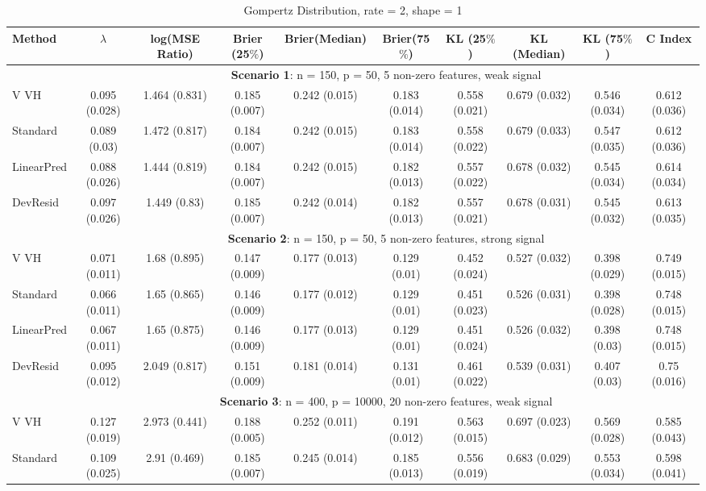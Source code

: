 \documentclass{article}
\begin{document}
\begin{landscape}
\begin{table}[ht]
\caption{\label{Tab:sim} Gompertz Distribution, rate = 2, shape = 1}
\centering
\begin{tabular}[t]{lccccccccc}
\toprule
 Method & $\lambda$ & log(MSE Ratio) & Brier (25$\%$) & Brier(Median) & Brier(75$\%$) & KL (25$\%$)& KL (Median) & KL (75$\%$) & C Index\\
\midrule
&\multicolumn{9}{c}{\textbf{Scenario 1}: n = 150, p = 50, 5 non-zero features, weak signal}\\
\cline{2-10}
V VH  & 0.095 (0.028) & 1.464 (0.831) & 0.185 (0.007) & 0.242 (0.015) & 0.183 (0.014) & 0.558 (0.021) & 0.679 (0.032) & 0.546 (0.034) & 0.612 (0.036) \\
Standard  & 0.089 (0.03) & 1.472 (0.817) & 0.184 (0.007) & 0.242 (0.015) & 0.183 (0.014) & 0.558 (0.022) & 0.679 (0.033) & 0.547 (0.035) & 0.612 (0.036) \\
LinearPred  & 0.088 (0.026) & 1.444 (0.819) & 0.184 (0.007) & 0.242 (0.015) & 0.182 (0.013) & 0.557 (0.022) & 0.678 (0.032) & 0.545 (0.034) & 0.614 (0.034) \\
DevResid  & 0.097 (0.026) & 1.449 (0.83) & 0.185 (0.007) & 0.242 (0.014) & 0.182 (0.013) & 0.557 (0.021) & 0.678 (0.031) & 0.545 (0.032) & 0.613 (0.035) \\
\addlinespace
&\multicolumn{9}{c}{\textbf{Scenario 2}: n = 150, p = 50, 5 non-zero features, strong signal}\\
\cline{2-10}
V VH  & 0.071 (0.011) & 1.68 (0.895) & 0.147 (0.009) & 0.177 (0.013) & 0.129 (0.01) & 0.452 (0.024) & 0.527 (0.032) & 0.398 (0.029) & 0.749 (0.015) \\ 
Standard  & 0.066 (0.011) & 1.65 (0.865) & 0.146 (0.009) & 0.177 (0.012) & 0.129 (0.01) & 0.451 (0.023) & 0.526 (0.031) & 0.398 (0.028) & 0.748 (0.015) \\ 
LinearPred  & 0.067 (0.011) & 1.65 (0.875) & 0.146 (0.009) & 0.177 (0.013) & 0.129 (0.01) & 0.451 (0.024) & 0.526 (0.032) & 0.398 (0.03) & 0.748 (0.015) \\
 DevResid  & 0.095 (0.012) & 2.049 (0.817) & 0.151 (0.009) & 0.181 (0.014) & 0.131 (0.01) & 0.461 (0.022) & 0.539 (0.031) & 0.407 (0.03) & 0.75 (0.016) \\
\addlinespace
&\multicolumn{9}{c}{\textbf{Scenario 3}: n = 400, p = 10000, 20 non-zero features, weak signal}\\
\cline{2-10}
V VH  & 0.127 (0.019) & 2.973 (0.441) & 0.188 (0.005) & 0.252 (0.011) & 0.191 (0.012) & 0.563 (0.015) & 0.697 (0.023) & 0.569 (0.028) & 0.585 (0.043) \\ 
Standard  & 0.109 (0.025) & 2.91 (0.469) & 0.185 (0.007) & 0.245 (0.014) & 0.185 (0.013) & 0.556 (0.019) & 0.683 (0.029) & 0.553 (0.034) & 0.598 (0.041) \\

\end{tabular}
\end{table}
\end{landscape}
\end{document}
